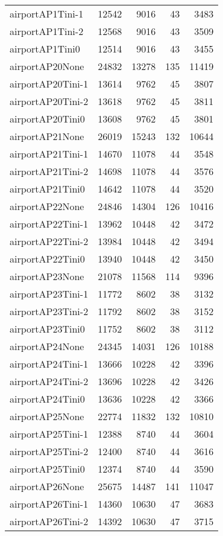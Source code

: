 \begin{longtable}{lrrrr}
airportAP1Tini-1 & 12542 & 9016 & 43 & 3483 \\
airportAP1Tini-2 & 12568 & 9016 & 43 & 3509 \\
airportAP1Tini0 & 12514 & 9016 & 43 & 3455 \\
airportAP20None & 24832 & 13278 & 135 & 11419 \\
airportAP20Tini-1 & 13614 & 9762 & 45 & 3807 \\
airportAP20Tini-2 & 13618 & 9762 & 45 & 3811 \\
airportAP20Tini0 & 13608 & 9762 & 45 & 3801 \\
airportAP21None & 26019 & 15243 & 132 & 10644 \\
airportAP21Tini-1 & 14670 & 11078 & 44 & 3548 \\
airportAP21Tini-2 & 14698 & 11078 & 44 & 3576 \\
airportAP21Tini0 & 14642 & 11078 & 44 & 3520 \\
airportAP22None & 24846 & 14304 & 126 & 10416 \\
airportAP22Tini-1 & 13962 & 10448 & 42 & 3472 \\
airportAP22Tini-2 & 13984 & 10448 & 42 & 3494 \\
airportAP22Tini0 & 13940 & 10448 & 42 & 3450 \\
airportAP23None & 21078 & 11568 & 114 & 9396 \\
airportAP23Tini-1 & 11772 & 8602 & 38 & 3132 \\
airportAP23Tini-2 & 11792 & 8602 & 38 & 3152 \\
airportAP23Tini0 & 11752 & 8602 & 38 & 3112 \\
airportAP24None & 24345 & 14031 & 126 & 10188 \\
airportAP24Tini-1 & 13666 & 10228 & 42 & 3396 \\
airportAP24Tini-2 & 13696 & 10228 & 42 & 3426 \\
airportAP24Tini0 & 13636 & 10228 & 42 & 3366 \\
airportAP25None & 22774 & 11832 & 132 & 10810 \\
airportAP25Tini-1 & 12388 & 8740 & 44 & 3604 \\
airportAP25Tini-2 & 12400 & 8740 & 44 & 3616 \\
airportAP25Tini0 & 12374 & 8740 & 44 & 3590 \\
airportAP26None & 25675 & 14487 & 141 & 11047 \\
airportAP26Tini-1 & 14360 & 10630 & 47 & 3683 \\
airportAP26Tini-2 & 14392 & 10630 & 47 & 3715 \\

\end{longtable}
